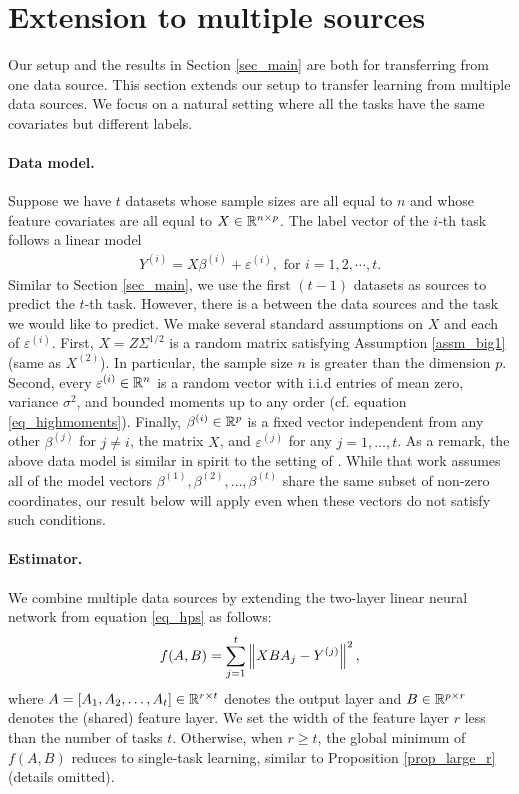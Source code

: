 \section{Extension to multiple sources}\label{sec_same}

Our setup and the results in Section \ref{sec_main} are both for transferring from one data source.
This section extends our setup to transfer learning from multiple data sources.
We focus on a natural setting where all the tasks have the same covariates but different labels.

\paragraph{Data model.} Suppose we have $t$ datasets whose sample sizes are all equal to $n$ and whose feature covariates are all equal to $X \in \mathbb{R}^{n \times p}$. The label vector of the $i$-th task follows a linear model
\begin{align}\label{eq_mtl_data}
    Y^{(i)} = X \beta^{(i)} + \varepsilon^{(i)}, \text{ for } i=1, 2,\cdots, t.
\end{align}
Similar to Section \ref{sec_main}, we use the first $(t-1)$ datasets as sources to predict the $t$-th task.
However, there is a  between the data sources and the task we would like to predict.
We make several standard assumptions on $X$ and each of $\varepsilon^{(i)}$.
First, $X = Z\Sigma^{1/2}$ is a random matrix satisfying Assumption \ref{assm_big1} (same as $X^{(2)}$).
In particular, the sample size $n$ is greater than the dimension $p$.
Second, every $\varepsilon^{(i)} \in \mathbb{R}^{n}$ is a random vector with i.i.d entries of mean zero, variance $\sigma^2$, and bounded moments up to any order (cf. equation \eqref{eq_highmoments}).
Finally, $\beta^{(i)} \in \mathbb{R}^{p}$ is a fixed vector independent from any other $\beta^{(j)}$ for $j \neq i$, the matrix $X$, and $\varepsilon^{(j)}$ for any $j=1,\dots,t$.
As a remark, the above data model is similar in spirit to the setting of \citet{lounici2011oracle}.
While that work assumes all of the model vectors $\beta^{(1)}, \beta^{(2)}, \dots, \beta^{(t)}$ share the same subset of non-zero coordinates, our result below will apply even when these vectors do not satisfy such conditions.

\paragraph{Estimator.} We combine multiple data sources by extending the two-layer linear neural network from equation \eqref{eq_hps} as follows:
\begin{align}
	f(A, B) = \sum_{j=1}^t \bignorm{X B A_j - Y^{(j)}}^2, \label{eq_mtl_same_cov}
\end{align}
where $A = [A_1, A_2, \dots, A_t] \in \mathbb{R}^{r \times t}$ denotes the output layer and $B \in \mathbb{R}^{p \times r}$ denotes the (shared) feature layer.
We set the width of the feature layer $r$ less than the number of tasks $t$.
Otherwise, when $r \ge t$, the global minimum of $f(A, B)$ reduces to single-task learning, similar to Proposition \ref{prop_large_r} (details omitted).

